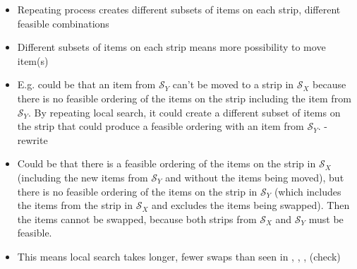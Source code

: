 \documentclass{elsarticle}
\begin{document}
\begin{itemize}
	\item Repeating process creates different subsets of items on each strip, different feasible combinations
	\item Different subsets of items on each strip means more possibility to move item(s)
	\item E.g. could be that an item from $\mathcal{S}_Y$ can't be moved to a strip in $\mathcal{S}_X$ because there is no feasible ordering of the items on the strip including the item from $\mathcal{S}_Y$. By repeating local search, it could create a different subset of items on the strip that could produce a feasible ordering with an item from $\mathcal{S}_Y$. - rewrite
	\item Could be that there is a feasible ordering of the items on the strip in $\mathcal{S}_X$ (including the new items from $\mathcal{S}_Y$ and without the items being moved), but there is no feasible ordering of the items on the strip in $\mathcal{S}_Y$ (which includes the items from the strip in $\mathcal{S}_X$ and excludes the items being swapped). Then the items cannot be swapped, because both strips from $\mathcal{S}_X$ and $\mathcal{S}_Y$ must be feasible. 
	\item This means local search takes longer, fewer swaps than seen in \cite{lewis2009}, \cite{lewis2017}, \cite{levine2004}, \cite{falkenauer1996} (check)
\end{itemize}
\end{document}
